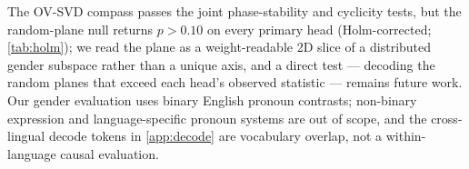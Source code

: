 The OV-SVD compass passes the joint phase-stability and cyclicity
tests, but the random-plane null returns $p > 0.10$ on every primary
head (Holm-corrected; \cref{tab:holm}); we read the plane as a
weight-readable 2D slice of a distributed gender subspace rather
than a unique axis, and a direct test --- decoding the random
planes that exceed each head's observed statistic --- remains
future work. Our gender evaluation uses binary English pronoun
contrasts; non-binary expression and language-specific pronoun
systems are out of scope, and the cross-lingual decode tokens in
\cref{app:decode} are vocabulary overlap, not a within-language
causal evaluation.
